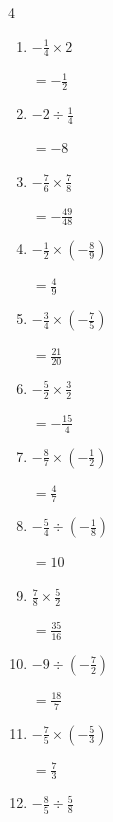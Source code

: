 \begin{multicols}{4}
\begin{enumerate}
        $\displaystyle =\frac{21}{5}$

  \item $\displaystyle -\frac{1}{4}\times{}2$

        $\displaystyle =-\frac{1}{2}$

  \item $\displaystyle -2\div{}\frac{1}{4}$

        $\displaystyle =-8$

  \item $\displaystyle -\frac{7}{6}\times{}\frac{7}{8}$

        $\displaystyle =-\frac{49}{48}$

  \item $\displaystyle -\frac{1}{2}\times{}\left(-\frac{8}{9}\right)$

        $\displaystyle =\frac{4}{9}$

  \item $\displaystyle -\frac{3}{4}\times{}\left(-\frac{7}{5}\right)$

        $\displaystyle =\frac{21}{20}$

  \item $\displaystyle -\frac{5}{2}\times{}\frac{3}{2}$

        $\displaystyle =-\frac{15}{4}$

  \item $\displaystyle -\frac{8}{7}\times{}\left(-\frac{1}{2}\right)$

        $\displaystyle =\frac{4}{7}$

  \item $\displaystyle -\frac{5}{4}\div{}\left(-\frac{1}{8}\right)$

        $\displaystyle =10$

\columnbreak %

\resetques

  \item $\displaystyle \frac{7}{8}\times{}\frac{5}{2}$

        $\displaystyle =\frac{35}{16}$

  \item $\displaystyle -9\div{}\left(-\frac{7}{2}\right)$

        $\displaystyle =\frac{18}{7}$

  \item $\displaystyle -\frac{7}{5}\times{}\left(-\frac{5}{3}\right)$

        $\displaystyle =\frac{7}{3}$

  \item $\displaystyle -\frac{8}{5}\div{}\frac{5}{8}$


\end{enumerate}
\end{multicols}
